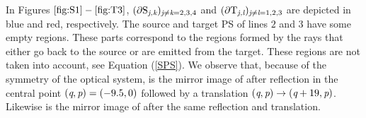 \indent In Figures $\ref{fig:S1}-\ref{fig:T3}$,  $(\partial \mbox{$\textup{S}_{\textit{\textit{j},\textit{k}}}$})_{\textit{\textit{j}}\neq\textit{\textit{k}}=2, 3, 4}$ and $(\partial \mbox{$\textup{T}_{\textit{\textit{j},\textit{l}}}$})_{\textit{\textit{j}}\neq\textit{\textit{l}}=1, 2, 3}$ are depicted in blue and red, respectively. The source and target PS of lines $2$ and $3$ have some empty regions. 
These parts correspond to the regions formed by the rays that either go back to the source or are emitted from the target. These regions are not taken into account, see Equation (\ref{SPS}). We observe that, because of the symmetry of the optical system,  is the mirror image of  after reflection in the central point 
$(\textit{q}, \textit{p}) = (-9.5, 0)$ followed by a translation $(\textit{q}, \textit{p})\rightarrow(\textit{q}+19, \textit{p})$. Likewise  is the mirror image of  after the same reflection and translation.
